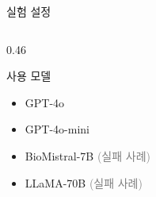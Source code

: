 \documentclass[
11pt,notheorems,hyperref={pdfauthor=whatever}
]{beamer}
\begin{document}
\begin{frame}{실험 설정}
\begin{columns}[c]
\begin{column}{0.46\textwidth}
    \vspace{0.4em}

    \begin{block}{사용 모델}
    \footnotesize
    \begin{itemize}
        \item GPT-4o
        \item GPT-4o-mini
        \item BioMistral-7B \textcolor{gray}{(실패 사례)}
        \item LLaMA-70B \textcolor{gray}{(실패 사례)}
    \end{itemize}
    \end{block}

\end{column}

\end{columns}
\end{frame}
\end{document}
